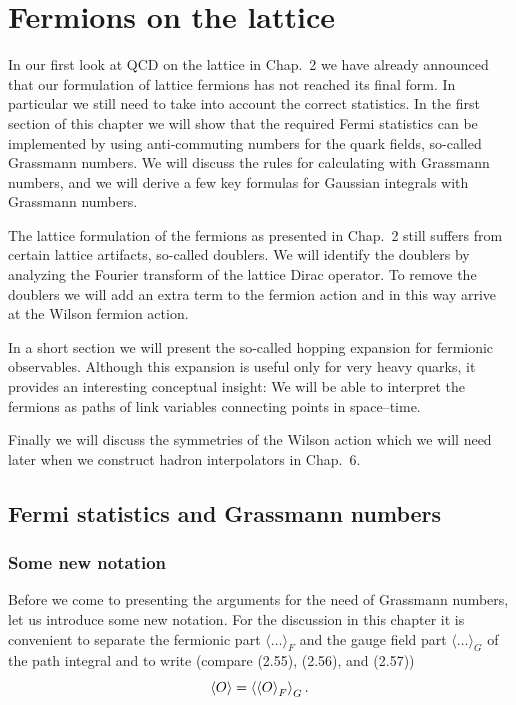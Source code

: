 
\chapter{Fermions on the lattice}

In our first look at QCD on the lattice in Chap.~2 we have already announced
that our formulation of lattice fermions has not reached its final form. In
particular we still need to take into account the correct statistics. In the first
section of this chapter we will show that the required Fermi statistics can be
implemented by using anti-commuting numbers for the quark fields, so-called
Grassmann numbers. We will discuss the rules for calculating with Grassmann
numbers, and we will derive a few key formulas for Gaussian integrals with
Grassmann numbers.

The lattice formulation of the fermions as presented in Chap.~2 still suffers
from certain lattice artifacts, so-called doublers. We will identify the doublers
by analyzing the Fourier transform of the lattice Dirac operator. To remove
the doublers we will add an extra term to the fermion action and in this way
arrive at the Wilson fermion action.

In a short section we will present the so-called hopping expansion for
fermionic observables. Although this expansion is useful only for very heavy
quarks, it provides an interesting conceptual insight: We will be able to interpret the fermions as paths of link variables connecting points in space--time.

Finally we will discuss the symmetries of the Wilson action which we will need
later when we construct hadron interpolators in Chap.~6.

\section{Fermi statistics and Grassmann numbers}

\subsection{Some new notation}

Before we come to presenting the arguments for the need of Grassmann numbers, let us introduce some new notation. For the discussion in this chapter
it is convenient to separate the fermionic part $\langle\ldots\rangle_F$ and the gauge field part
$\langle\ldots\rangle_G$ of the path integral and to write (compare (2.55), (2.56), and (2.57))
\begin{equation}
  \left\langle O \right\rangle = \left\langle \left\langle O \right\rangle_F \right\rangle_G .
\end{equation}

